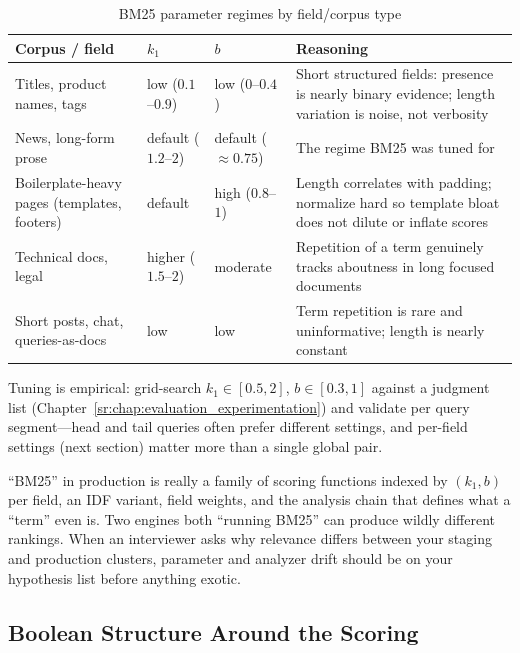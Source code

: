 \begin{table}[H]
\centering
\caption{BM25 parameter regimes by field/corpus type}
\label{sr:tab:bm25_tuning}
\begin{tabularx}{\textwidth}{p{3.1cm}p{2.1cm}p{2.0cm}X}
\toprule
\textbf{Corpus / field} & \textbf{$k_1$} & \textbf{$b$} & \textbf{Reasoning} \\
\midrule
Titles, product names, tags & low ($0.1$--$0.9$) & low ($0$--$0.4$) & Short structured fields: presence is nearly binary evidence; length variation is noise, not verbosity \\
News, long-form prose & default ($1.2$--$2$) & default ($\approx 0.75$) & The regime BM25 was tuned for \\
Boilerplate-heavy pages (templates, footers) & default & high ($0.8$--$1$) & Length correlates with padding; normalize hard so template bloat does not dilute or inflate scores \\
Technical docs, legal & higher ($1.5$--$2$) & moderate & Repetition of a term genuinely tracks aboutness in long focused documents \\
Short posts, chat, queries-as-docs & low & low & Term repetition is rare and uninformative; length is nearly constant \\
\bottomrule
\end{tabularx}
\end{table}

Tuning is empirical: grid-search $k_1 \in [0.5, 2]$, $b \in [0.3, 1]$ against a judgment list (Chapter~\ref{sr:chap:evaluation_experimentation}) and validate per query segment---head and tail queries often prefer different settings, and per-field settings (next section) matter more than a single global pair.

\begin{keyinsight}
``BM25'' in production is really a family of scoring functions indexed by $(k_1, b)$ per field, an IDF variant, field weights, and the analysis chain that defines what a ``term'' even is. Two engines both ``running BM25'' can produce wildly different rankings. When an interviewer asks why relevance differs between your staging and production clusters, parameter and analyzer drift should be on your hypothesis list before anything exotic.
\end{keyinsight}

\subsection{Boolean Structure Around the Scoring}


